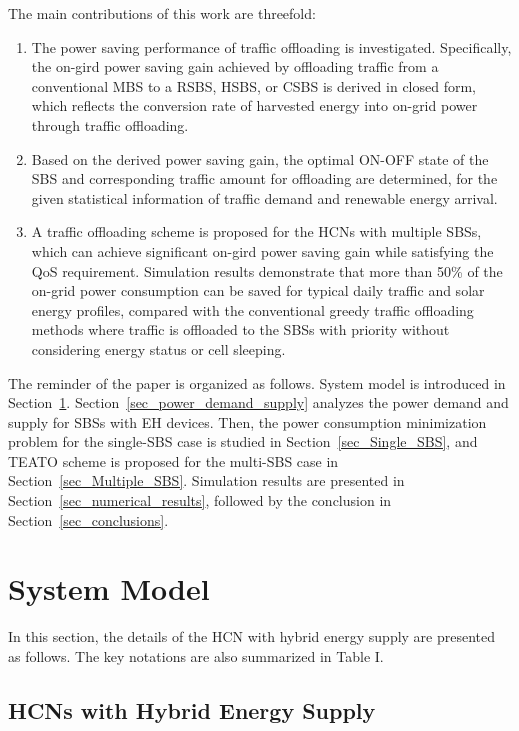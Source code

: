 \documentclass[12pt, draftclsnofoot,onecolumn]{IEEEtran}
\begin{document}
The main contributions of this work are threefold:
\begin{enumerate}
  \item The power saving performance of traffic offloading is investigated. Specifically, the on-gird power saving gain achieved by offloading traffic from a conventional MBS to a RSBS, HSBS, or CSBS is derived in closed form, which reflects the conversion rate of harvested energy into on-grid power through traffic offloading.
  \item Based on the derived power saving gain, the optimal ON-OFF state of the SBS and corresponding traffic amount for offloading are determined, for the given statistical information of traffic demand and renewable energy arrival.
  \item A traffic offloading scheme is proposed for the HCNs with multiple SBSs, which can achieve significant on-gird power saving gain while satisfying the QoS requirement. Simulation results demonstrate that more than 50\% of the on-grid power consumption can be saved for typical daily traffic and solar energy profiles, compared with the conventional greedy traffic offloading methods where traffic is offloaded to the SBSs with priority without considering energy status or cell sleeping.
\end{enumerate}

The reminder of the paper is organized as follows. System model is introduced in Section~\ref{sec_system_model}. Section~\ref{sec_power_demand_supply} analyzes the power demand and supply for SBSs with EH devices. Then, the power consumption minimization problem for the single-SBS case is studied in Section~\ref{sec_Single_SBS}, and TEATO scheme is proposed for the multi-SBS case in Section~\ref{sec_Multiple_SBS}. Simulation results are presented in Section~\ref{sec_numerical_results}, followed by the conclusion in Section~\ref{sec_conclusions}.

\section{System Model}
    \label{sec_system_model}
    In this section, the details of the HCN with hybrid energy supply are presented as follows.
The key notations are also summarized in Table I.

\subsection{HCNs with Hybrid Energy Supply}
\end{document}
